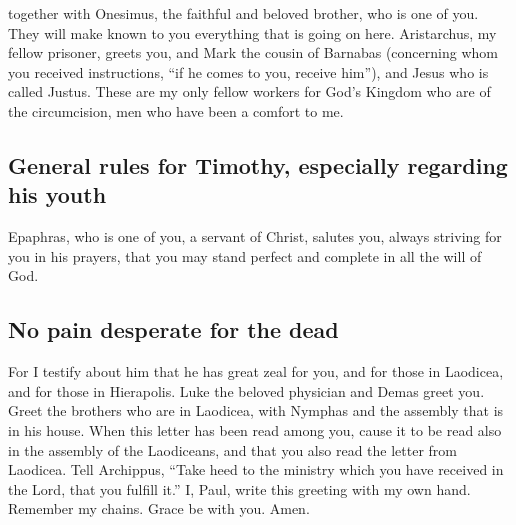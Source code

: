 \begin{paracol}{2}
\begin{otherlanguage}{english}
 together with Onesimus, the faithful and beloved brother,
who is one of you. They will make known to you everything that is going
on here.  Aristarchus, my fellow prisoner, greets you,
and Mark the cousin of Barnabas (concerning whom you received
instructions, ``if he comes to you, receive him''),  and
Jesus who is called Justus. These are my only fellow workers for God's
Kingdom who are of the circumcision, men who have been a comfort to me.

\hypertarget{general-rules-for-timothy-especially-regarding-his-youth}{%
\subsection{General rules for Timothy, especially regarding his
youth}\label{general-rules-for-timothy-especially-regarding-his-youth}}

 Epaphras, who is one of you, a servant of Christ,
salutes you, always striving for you in his prayers, that you may stand
perfect and complete in all the will of God.

\hypertarget{no-pain-desperate-for-the-dead}{%
\subsection{No pain desperate for the
dead}\label{no-pain-desperate-for-the-dead}}

 For I testify about him that he has great zeal for you,
and for those in Laodicea, and for those in Hierapolis. 
Luke the beloved physician and Demas greet you.  Greet
the brothers who are in Laodicea, with Nymphas and the assembly that is
in his house.  When this letter has been read among you,
cause it to be read also in the assembly of the Laodiceans, and that you
also read the letter from Laodicea.  Tell Archippus,
``Take heed to the ministry which you have received in the Lord, that
you fulfill it.''  I, Paul, write this greeting with my
own hand. Remember my chains. Grace be with you. Amen.
\end{otherlanguage} \end{paracol}
